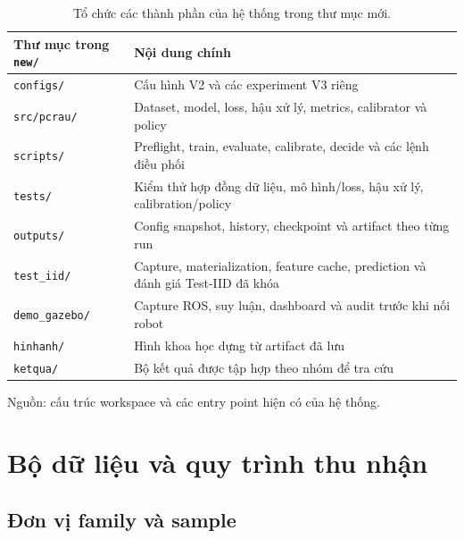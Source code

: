 \begin{table}[htbp]
    \centering
    \setlength{\tabcolsep}{4pt}
    \renewcommand{\arraystretch}{1.15}
    \caption{Tổ chức các thành phần của hệ thống trong thư mục mới.}
    \label{tab:setup-directory}
    \small
    \begin{tabularx}{\textwidth}{@{}>{\raggedright\arraybackslash}p{}>{\raggedright\arraybackslash}X@{}}
        \toprule
        Thư mục trong \texttt{new/} & Nội dung chính \\
        \midrule
        \texttt{configs/} & Cấu hình V2 và các experiment V3 riêng \\
        \texttt{src/pcrau/} & Dataset, model, loss, hậu xử lý,
        metrics, calibrator và policy \\
        \texttt{scripts/} & Preflight, train, evaluate,
        calibrate, decide và các lệnh điều phối \\
        \texttt{tests/} & Kiểm thử hợp đồng dữ liệu, mô hình/loss,
        hậu xử lý, calibration/policy \\
        \texttt{outputs/} & Config snapshot, history,
        checkpoint và artifact theo từng run \\
        \texttt{test\_\allowbreak iid/} & Capture, materialization, feature cache,
        prediction và đánh giá Test-IID đã khóa \\
        \texttt{demo\_\allowbreak gazebo/} & Capture ROS, suy luận, dashboard
        và audit trước khi nối robot \\
        \texttt{hinhanh/} & Hình khoa học dựng từ artifact đã lưu \\
        \texttt{ketqua/} & Bộ kết quả được tập hợp theo nhóm để tra cứu \\
        \bottomrule
    \end{tabularx}
    \vspace{2pt}
    {\footnotesize\raggedright Nguồn: cấu trúc workspace và các entry point
    hiện có của hệ thống.\par}
\end{table}

\section{Bộ dữ liệu và quy trình thu nhận}
\label{sec:setup-dataset}

\subsection{Đơn vị family và sample}

